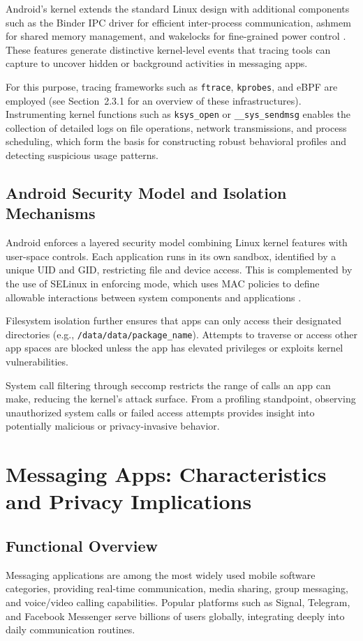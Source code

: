 \documentclass[a4paper,12pt]{report}
\begin{document}
Android’s kernel extends the standard Linux design with additional components such as the Binder IPC driver for efficient inter-process communication, ashmem for shared memory management, and wakelocks for fine-grained power control \cite{AOSPArchOverview}. These features generate distinctive kernel-level events that tracing tools can capture to uncover hidden or background activities in messaging apps.

For this purpose, tracing frameworks such as \texttt{ftrace}, \texttt{kprobes}, and eBPF are employed (see Section~2.3.1 for an overview of these infrastructures). Instrumenting kernel functions such as \texttt{ksys\_open} or \texttt{\_\_sys\_sendmsg} enables the collection of detailed logs on file operations, network transmissions, and process scheduling, which form the basis for constructing robust behavioral profiles and detecting suspicious usage patterns.

\subsection{Android Security Model and Isolation Mechanisms}
Android enforces a layered security model combining Linux kernel features with user-space controls. Each application runs in its own sandbox, identified by a unique UID and GID, restricting file and device access. This is complemented by the use of SELinux in enforcing mode, which uses MAC policies to define allowable interactions between system components and applications \cite{AOSPSecurity}.

Filesystem isolation further ensures that apps can only access their designated directories (e.g., \texttt{/data/data/{package\_name}}). Attempts to traverse or access other app spaces are blocked unless the app has elevated privileges or exploits kernel vulnerabilities.

System call filtering through seccomp restricts the range of calls an app can make, reducing the kernel's attack surface. From a profiling standpoint, observing unauthorized system calls or failed access attempts provides insight into potentially malicious or privacy-invasive behavior.

\section{Messaging Apps: Characteristics and Privacy Implications}

\subsection{Functional Overview}
Messaging applications are among the most widely used mobile software categories, providing real-time communication, media sharing, group messaging, and voice/video calling capabilities. Popular platforms such as Signal, Telegram, and Facebook Messenger serve billions of users globally, integrating deeply into daily communication routines.
\end{document}
